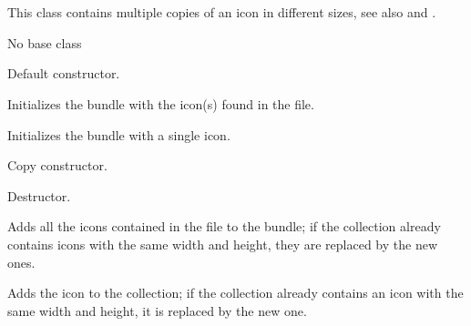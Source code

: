 \section{}\label{wxiconbundle}

This class contains multiple copies of an icon in different sizes,
see also  and
.


No base class


\label{wxiconbundlewxiconbundle}


Default constructor.


Initializes the bundle with the icon(s) found in the file.


Initializes the bundle with a single icon.


Copy constructor.

\label{wxiconbundledtor}


Destructor.

\label{wxiconbundleaddicon}


Adds all the icons contained in the file to the bundle;
if the collection already contains icons with the same
width and height, they are replaced by the new ones.


Adds the icon to the collection; if the collection already
contains an icon with the same width and height, it is
replaced by the new one.

\label{wxiconbundlegeticon}


